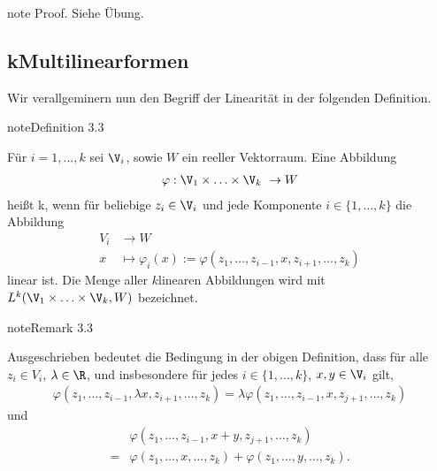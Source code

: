 \documentclass[letterpaper,10pt,english]{jupyterBook}
\begin{document}
\begin{sphinxadmonition}{note}
\sphinxAtStartPar
Proof. Siehe Übung.
\end{sphinxadmonition}


\subsection{k\sphinxhyphen{}Multilinearformen}
\label{\detokenize{vektoranalysis/multilinear:k-multilinearformen}}
\sphinxAtStartPar
Wir verallgeminern nun den Begriff der Linearität in der folgenden Definition.
\label{vektoranalysis/multilinear:def:multilinear}
\begin{sphinxadmonition}{note}{Definition 3.3}



\sphinxAtStartPar
Für \(i=1,\ldots,k\) sei \(\V_i\), sowie \(W\) ein reeller Vektorraum. Eine Abbildung
\begin{equation*}
\begin{split}\varphi:\V_1\times\ldots\times \V_k\ \to W\end{split}
\end{equation*}
\sphinxAtStartPar
heißt k\sphinxhyphen{}, wenn für beliebige \(z_i\in\V_i\) und jede Komponente \(i\in\{1,\ldots,k\}\) die Abbildung
\begin{equation*}
\begin{split}V_i &\to W\\
x&\mapsto \varphi_i(x):= \varphi(z_1,\ldots, z_{i-1}, x, z_{i+1},\ldots,z_k)\end{split}
\end{equation*}
\sphinxAtStartPar
linear ist. Die Menge aller \(k\)\sphinxhyphen{}linearen Abbildungen wird mit \(L^k(\V_1\times\ldots\times \V_k, W)\) bezeichnet.
\end{sphinxadmonition}
\label{vektoranalysis/multilinear:remark-6}
\begin{sphinxadmonition}{note}{Remark 3.3}



\sphinxAtStartPar
Ausgeschrieben bedeutet die Bedingung in der obigen Definition, dass für alle \(z_i\in V_i\), \(\lambda\in\R\),
und insbesondere für jedes \(i\in\{1,\ldots,k\}\), \(x,y\in \V_i\)  gilt,
\begin{equation*}
\begin{split}\varphi(z_1,\ldots,z_{i-1},\lambda x, z_{i+1},\ldots,z_k) = \lambda
\varphi(z_1,\ldots,z_{i-1}, x, z_{j+1}, \ldots,z_k)\end{split}
\end{equation*}
\sphinxAtStartPar
und
\begin{equation*}
\begin{split}&\varphi(z_1,\ldots,z_{i-1},x+y,z_{j+1},\ldots,z_k)\\
= 
&\varphi(z_1,\ldots,x,\ldots,z_k) + \varphi(z_1,\ldots,y,\ldots,z_k).\end{split}
\end{equation*}\end{sphinxadmonition}
\end{document}
